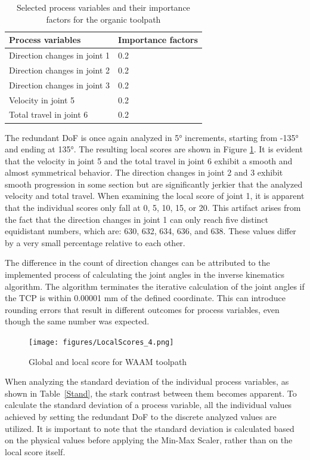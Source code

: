 \begin{table}[H]
	\centering
	\caption{Selected process variables and their importance factors for the organic toolpath}
	\begin{tabular}{||l|l||}
		Process variables& Importance factors \\
		\hline
		\hline
		\hline
		Direction changes in joint 1	&		0.2 \\
		Direction changes in joint 2	&		0.2 \\
		Direction changes in joint 3	&		0.2 \\
		Velocity in joint 5	&		0.2 \\
		Total travel in joint 6	&		0.2 \\
		\hline
		\hline
	\end{tabular}
	
	
	\label{ravenparams}
\end{table}

The redundant \acrshort{DoF} is once again analyzed in 5° increments, starting from -135° and ending at 135°. The resulting local scores are shown in Figure \ref{LS4}. It is evident that the velocity in joint 5 and the total travel in joint 6 exhibit a smooth and almost symmetrical behavior. The direction changes in joint 2 and 3 exhibit smooth progression in some section but are significantly jerkier that the analyzed velocity and total travel. When examining the local score of joint 1, it is apparent that the individual scores only fall at 0, 5, 10, 15, or 20. This artifact arises from the fact that the direction changes in joint 1 can only reach five distinct equidistant numbers, which are: 630, 632, 634, 636, and 638. These values differ by a very small percentage relative to each other.

The difference in the count of direction changes can be attributed to the implemented process of calculating the joint angles in the inverse kinematics algorithm. The algorithm terminates the iterative calculation of the joint angles if the \acrshort{TCP} is within 0.00001 mm of the defined coordinate. This can introduce rounding errors that result in different outcomes for process variables, even though the same number was expected.

\begin{figure}[H]
	\centerline{\texttt{[image: figures/LocalScores\_4.png]}}
	\caption{Global and local score for WAAM toolpath}
	\label{LS4}
\end{figure}

When analyzing the standard deviation of the individual process variables, as shown in Table~\ref{Stand}, the stark contrast between them becomes apparent. To calculate the standard deviation of a process variable, all the individual values achieved by setting the redundant \acrshort{DoF} to the discrete analyzed values are utilized. It is important to note that the standard deviation is calculated based on the physical values before applying the Min-Max Scaler, rather than on the local score itself.

